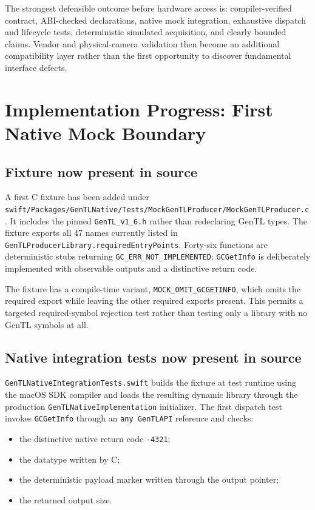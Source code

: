 \documentclass[11pt,a4paper]{report}
\begin{document}
The strongest defensible outcome before hardware access is: compiler-verified contract, ABI-checked declarations, native mock integration, exhaustive dispatch and lifecycle tests, deterministic simulated acquisition, and clearly bounded claims. Vendor and physical-camera validation then become an additional compatibility layer rather than the first opportunity to discover fundamental interface defects.



\chapter{Implementation Progress: First Native Mock Boundary}

\section{Fixture now present in source}
A first C fixture has been added under
\texttt{swift/Packages/GenTLNative/Tests/MockGenTLProducer/MockGenTLProducer.c}.
It includes the pinned \texttt{GenTL\_v1\_6.h} rather than redeclaring GenTL types. The fixture exports all 47 names currently listed in \texttt{GenTLProducerLibrary.requiredEntryPoints}. Forty-six functions are deterministic stubs returning \texttt{GC\_ERR\_NOT\_IMPLEMENTED}; \texttt{GCGetInfo} is deliberately implemented with observable outputs and a distinctive return code.

The fixture has a compile-time variant, \texttt{MOCK\_OMIT\_GCGETINFO}, which omits the required export while leaving the other required exports present. This permits a targeted required-symbol rejection test rather than testing only a library with no GenTL symbols at all.

\section{Native integration tests now present in source}
\texttt{GenTLNativeIntegrationTests.swift} builds the fixture at test runtime using the macOS SDK compiler and loads the resulting dynamic library through the production \texttt{GenTLNativeImplementation} initializer. The first dispatch test invokes \texttt{GCGetInfo} through an \texttt{any GenTLAPI} reference and checks:
\begin{itemize}
  \item the distinctive native return code \texttt{-4321};
  \item the datatype written by C;
  \item the deterministic payload marker written through the output pointer;
  \item the returned output size.
\end{itemize}
\end{document}
